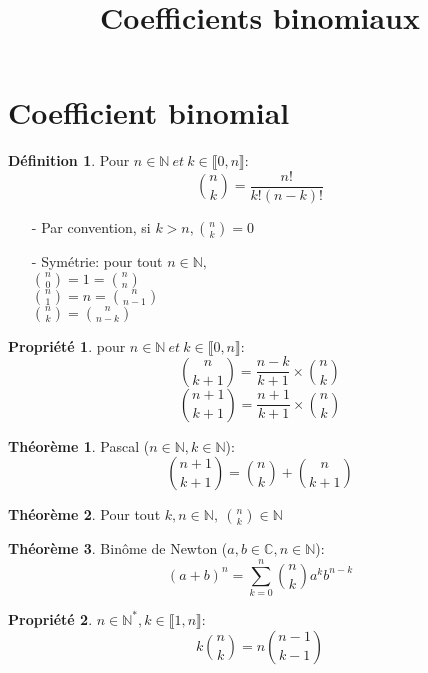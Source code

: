 \documentclass[fleqn]{article}
\title{Coefficients binomiaux}
\date{}
\theoremstyle{definition} \newtheorem*{defi}{D\'efinition}
\theoremstyle{definition} \newtheorem*{theo}{Th\'eor\`eme}
\theoremstyle{definition} \newtheorem*{prop}{Propri\'et\'e}
\begin{document}
\maketitle

\section{Coefficient binomial}
\begin{defi}
	Pour \(n \in \mathbb{N}\ et\ k \in \llbracket 0,n \rrbracket \): \\
	\[ \binom{n}{k} = \frac{n!}{k!(n-k)!} \]
\end{defi}
\begin{itemize}
	\item [-] Par convention, si $k>n, \binom{n}{k} = 0$
	\item [-] Sym\'etrie: pour tout \(n \in \mathbb{N},\) \\
		$\binom{n}{0} = 1 = \binom{n}{n}$ \\
		$\binom{n}{1} = n = \binom{n}{n-1}$ \\
		$\binom{n}{k} = \binom{n}{n-k}$
\end{itemize}
\begin{prop} pour \(n \in \mathbb{N}\ et\ k \in \llbracket 0,n\rrbracket \):
	\[\binom{n}{k+1} = \frac{n-k}{k+1} \times \binom{n}{k} \]
	\[\binom{n+1}{k+1} = \frac{n+1}{k+1} \times \binom{n}{k} \]
\end{prop}
\begin{theo} Pascal (\(n \in \mathbb{N}, k \in \mathbb{N}\)): \\
	\[\binom{n+1}{k+1} = \binom{n}{k} + \binom{n}{k+1}\]
\end{theo}
\begin{theo}
	Pour tout \(k,n \in \mathbb{N},\ \binom{n}{k} \in \mathbb{N}\)
\end{theo}
\begin{theo} Bin\^{o}me de Newton (\(a,b \in \mathbb{C}, n \in \mathbb{N}\)):
	\[(a+b)^n = \sum_{k=0}^{n} \binom{n}{k}a^kb^{n-k}\]
\end{theo}
\begin{prop} \(n \in \mathbb{N}^*, k \in \llbracket 1,n \rrbracket \): \\
	\[k\binom{n}{k} = n\binom{n-1}{k-1}\] \\
\end{prop}
\end{document}
